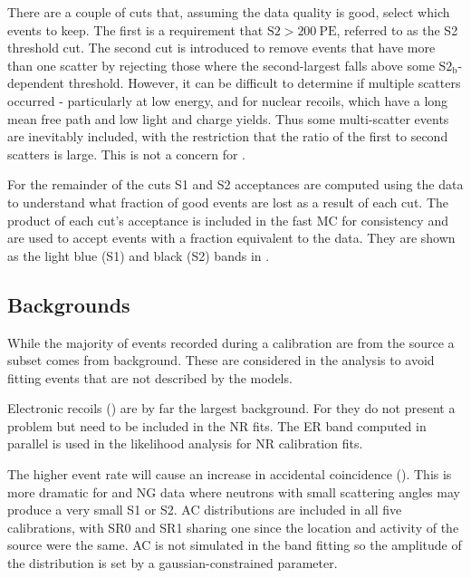 There are a couple of cuts that, assuming the data quality is good, select which events to keep.  The first is a requirement that
$\mathrm{S2} > 200\ \mathrm{PE}$, referred to as the S2 threshold cut.  The second cut is introduced to remove events that have more than
one scatter by rejecting those where the second-largest \stwob falls above some $\mathrm{S2_b}$-dependent threshold.  However, it can be
difficult to determine if multiple scatters occurred - particularly at low energy, and for nuclear
recoils, which have a long mean free path and low light and charge yields.  Thus some multi-scatter events are inevitably included,
with the restriction that the ratio of the first to second scatters is large.  This is not a concern for .

For the remainder of the cuts S1 and S2 acceptances are computed using the data to understand what fraction of good events are lost
as a result of each cut.  The product of each cut's acceptance is included in the fast MC for consistency and are used to accept events
with a fraction equivalent to the data.  They are shown as the light blue (S1) and
black (S2) bands in .



\subsection{Backgrounds}
\label{subsec:er_nr_calibrations_parameter_determ_additional_components}
While the majority of events recorded during a calibration are from the source a subset comes
from background.  These are considered in the analysis to avoid fitting events that are not described by the models.

Electronic recoils () are by far the largest background.  For 
they do not present a problem but need to be included in the NR fits.  The ER band computed in parallel is used in the likelihood
analysis for NR calibration fits.

The higher event rate will cause an increase in accidental coincidence ().  This is more dramatic
for \ambe and NG data where neutrons with small scattering angles may produce a very small S1 or S2.  AC distributions are included
in all five calibrations, with SR0 and SR1 \ambe sharing one since the location and activity of the source were the same.  AC is not
simulated in the band fitting so the amplitude of the distribution is set by a gaussian-constrained parameter.


